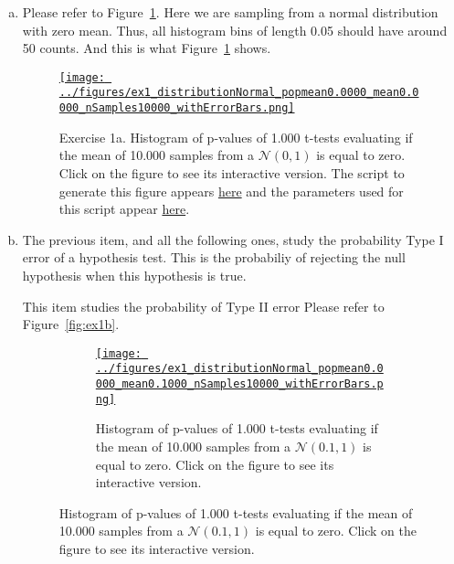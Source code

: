 \documentclass{article}
\def\fig_width{3.5in}
\begin{document}
\begin{enumerate}[(a)]

    \item  Please refer to Figure~\ref{fig:ex1a}. Here we are sampling from a
        normal distribution with zero mean. Thus, all histogram bins of length
        0.05 should have around 50 counts. And this is what
        Figure~\ref{fig:ex1a} shows.

        \begin{figure}[H]
            \begin{center}
                \href{https://www.gatsby.ucl.ac.uk/~rapela/neuroinformatics/2023/ws1/figures/ex1_distributionNormal_popmean0.0000_mean0.0000_nSamples10000_withErrorBars.html}{\texttt{[image: ../figures/ex1\_distributionNormal\_popmean0.0000\_mean0.0000\_nSamples10000\_withErrorBars.png]}}

                \caption{Exercise 1a. Histogram of p-values of 1.000 t-tests
                evaluating if the mean of 10.000 samples from a $\mathcal{N}(0,
                1)$ is equal to zero.
                Click on the figure to see its interactive version.
                The script to generate this figure appears
                \href{https://github.com/joacorapela/neuroinformatics23/blob/master/worksheets/ws1/mySolution/code/scripts/doEx1WithErrorBars.py}{here} and the
                parameters used for this script appear
                \href{https://github.com/joacorapela/neuroinformatics23/blob/master/worksheets/ws1/mySolution/code/scripts/doEx1aWithErrorBars.csh}{here}.}

                \label{fig:ex1a}

            \end{center}
        \end{figure}

    \item  The previous item, and all the following ones, study the probability
        Type I error of a hypothesis test. This is the probabiliy of rejecting
        the null hypothesis when this hypothesis is true.

        This item studies the probability of Type II error
        Please refer to Figure~\ref{fig:ex1b}.

        \begin{figure}[H]
            \begin{center}

                \begin{subfigure}{1.0\textwidth}
                    \centering
                    \href{https://www.gatsby.ucl.ac.uk/~rapela/neuroinformatics/2023/ws1/figures/ex1_distributionNormal_popmean0.0000_mean0.1000_nSamples10000_withErrorBars.html}{\texttt{[image: ../figures/ex1\_distributionNormal\_popmean0.0000\_mean0.1000\_nSamples10000\_withErrorBars.png]}}
                    \caption{Histogram of p-values of 1.000 t-tests evaluating if the mean of 10.000 samples from a $\mathcal{N}(0.1, 1)$ is equal to zero.  Click on the figure to see its interactive version.}
                    \label{fig:ex1b_1}
                \end{subfigure}


\end{center}
\end{figure}
\end{enumerate}
\end{document}

